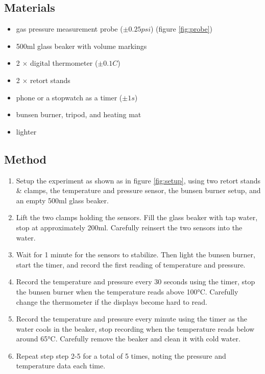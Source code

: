 \documentclass[a4paper,12pt]{article}
\begin{document}
\subsection{Materials}

\begin{itemize}
    \item gas pressure measurement probe ($\pm 0.25\si{psi}$) (figure \ref{fig:probe})
    \item 500ml glass beaker with volume markings
    \item 2 $\times$ digital thermometer ($\pm 0.1\si{C}$)
    \item 2 $\times$ retort stands
    \item phone or a stopwatch as a timer ($\pm 1\si{s}$)
    \item bunsen burner, tripod, and heating mat
    \item lighter
\end{itemize}

\subsection{Method}


\begin{enumerate}
    \item Setup the experiment as shown as in figure \ref{fig:setup}, using two retort stands \& clamps, the temperature and pressure sensor, the bunsen burner setup, and an empty 500ml glass beaker.
    \item Lift the two clamps holding the sensors. Fill the glass beaker with tap water, stop at approximately 200ml. Carefully reinsert the two sensors into the water.
    \item Wait for 1 minute for the sensors to stabilize. Then light the bunsen burner, start the timer, and record the first reading of temperature and pressure.
    \item Record the temperature and pressure every 30 seconds using the timer, stop the bunsen burner when the temperature reads above 100$\si{\celsius}$. Carefully change the thermometer if the displays become hard to read.
    \item Record the temperature and pressure every minute using the timer as the water cools in the beaker, stop recording when the temperature reads below around 65$\si{\celsius}$. Carefully remove the beaker and clean it with cold water.
    \item Repeat step step 2-5 for a total of 5 times, noting the pressure and temperature data each time.
\end{enumerate}
\end{document}

